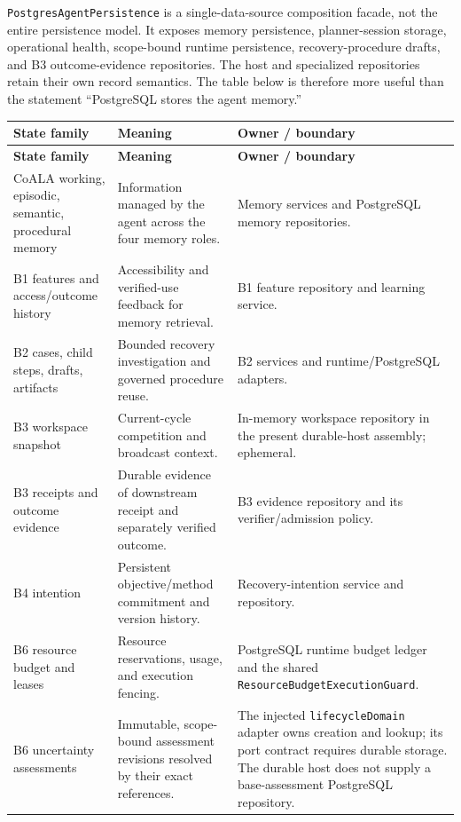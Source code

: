 \texttt{PostgresAgentPersistence} is a single-data-source composition facade, not the entire persistence model. It exposes memory persistence, planner-session storage, operational health, scope-bound runtime persistence, recovery-procedure drafts, and B3 outcome-evidence repositories. The host and specialized repositories retain their own record semantics. The table below is therefore more useful than the statement “PostgreSQL stores the agent memory.”

\begin{longtable}{P{0.20\textwidth} P{0.36\textwidth} P{0.35\textwidth}}
\toprule
\textbf{State family} & \textbf{Meaning} & \textbf{Owner / boundary} \\
\midrule
\endfirsthead
\toprule
\textbf{State family} & \textbf{Meaning} & \textbf{Owner / boundary} \\
\midrule
\endhead
CoALA working, episodic, semantic, procedural memory & Information managed by the agent across the four memory roles. & Memory services and PostgreSQL memory repositories. \\
B1 features and access/outcome history & Accessibility and verified-use feedback for memory retrieval. & B1 feature repository and learning service. \\
B2 cases, child steps, drafts, artifacts & Bounded recovery investigation and governed procedure reuse. & B2 services and runtime/PostgreSQL adapters. \\
B3 workspace snapshot & Current-cycle competition and broadcast context. & In-memory workspace repository in the present durable-host assembly; ephemeral. \\
B3 receipts and outcome evidence & Durable evidence of downstream receipt and separately verified outcome. & B3 evidence repository and its verifier/admission policy. \\
B4 intention & Persistent objective/method commitment and version history. & Recovery-intention service and repository. \\
B6 resource budget and leases & Resource reservations, usage, and execution fencing. & PostgreSQL runtime budget ledger and the shared \texttt{ResourceBudgetExecutionGuard}. \\
B6 uncertainty assessments & Immutable, scope-bound assessment revisions resolved by their exact references. & The injected \texttt{lifecycleDomain} adapter owns creation and lookup; its port contract requires durable storage. The durable host does not supply a base-assessment PostgreSQL repository. \\

\end{longtable}
